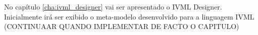No capítulo \ref{cha:ivml_designer} vai ser apresentado o IVML Designer. Inicialmente irá ser exibido o meta-modelo desenvolvido para a linguagem IVML (CONTINUAAR QUANDO IMPLEMENTAR DE FACTO O CAPITULO)

